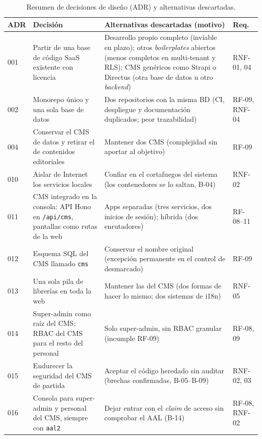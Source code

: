 \begin{table}[htbp]
  \centering
  \footnotesize
  \caption{Resumen de decisiones de diseño (ADR) y alternativas descartadas.}
  \label{tab:decisiones}
  \begin{tabularx}{\textwidth}{@{}l>{\raggedright\arraybackslash}p{4.3cm}>{\raggedright\arraybackslash}Xl@{}}
    \toprule
    \textbf{ADR} & \textbf{Decisión} & \textbf{Alternativas descartadas (motivo)} & \textbf{Req.} \\
    \midrule
    001 & Partir de una base de código SaaS existente con licencia %
      & Desarrollo propio completo (inviable en plazo); otros \textit{boilerplates} abiertos (menos completos en multi-tenant y RLS); CMS genéricos como Strapi o Directus (otra base de datos u otro \textit{backend}) & RNF-01, 04 \\
    002 & Monorepo único y una sola base de datos & Dos repositorios con la misma BD (CI, despliegue y documentación duplicados; peor trazabilidad) & RF-09, RNF-04 \\
    004 & Conservar el CMS de datos y retirar el de contenidos editoriales & Mantener dos CMS (complejidad sin aportar al objetivo) & RF-09 \\
    010 & Aislar de Internet los servicios locales & Confiar en el cortafuegos del sistema (los contenedores se lo saltan, B-04) & RNF-02 \\
    011 & CMS integrado en la consola: API Hono en \texttt{/api/cms}, pantallas como rutas de la web & Apps separadas (tres servicios, dos inicios de sesión); híbrida (dos enrutadores) & RF-08--11 \\
    012 & Esquema SQL del CMS llamado \texttt{cms} & Conservar el nombre original (excepción permanente en el control de desmarcado) & RF-09 \\
    013 & Una sola pila de librerías en toda la web & Mantener las del CMS (dos formas de hacer lo mismo; dos sistemas de i18n) & RNF-05 \\
    014 & Super-admin como raíz del CMS; RBAC del CMS para el resto del personal & Solo super-admin, sin RBAC granular (incumple RF-09) & RF-08, 09 \\
    015 & Endurecer la seguridad del CMS de partida & Aceptar el código heredado sin auditar (brechas confirmadas, B-05--B-09) & RNF-02, 03 \\
    016 & Consola para super-admin y personal del CMS, siempre con \texttt{aal2} & Dejar entrar con el \textit{claim} de acceso sin comprobar el AAL (B-14) & RF-08, RNF-02 \\
    \bottomrule
  \end{tabularx}
\end{table}

